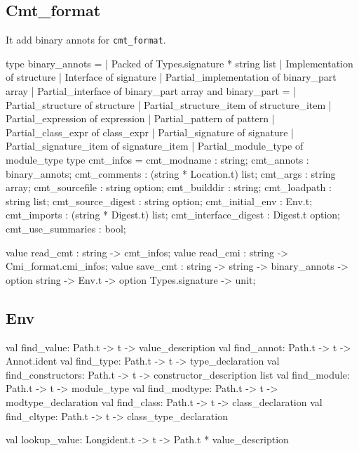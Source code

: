 \subsection{Cmt\_format}


It add binary annots for \verb|cmt_format|.


\begin{ocamlcode}
type binary_annots =
  | Packed of Types.signature * string list
  | Implementation of structure
  | Interface of signature
  | Partial_implementation of binary_part array
  | Partial_interface of binary_part array
and binary_part =
  | Partial_structure of structure
  | Partial_structure_item of structure_item
  | Partial_expression of expression
  | Partial_pattern of pattern
  | Partial_class_expr of class_expr
  | Partial_signature of signature
  | Partial_signature_item of signature_item
  | Partial_module_type of module_type
type cmt_infos = {
  cmt_modname : string;
  cmt_annots : binary_annots;
  cmt_comments : (string * Location.t) list;
  cmt_args : string array;
  cmt_sourcefile : string option;
  cmt_builddir : string;
  cmt_loadpath : string list;
  cmt_source_digest : string option;
  cmt_initial_env : Env.t;
  cmt_imports : (string * Digest.t) list;
  cmt_interface_digest : Digest.t option;
  cmt_use_summaries : bool;
}
\end{ocamlcode}
\begin{ocamlcode}
    value read_cmt : string -> cmt_infos;
    value read_cmi : string -> Cmi_format.cmi_infos;
    value save_cmt :
      string ->
      string ->
      binary_annots ->
      option string -> Env.t -> option Types.signature -> unit;
\end{ocamlcode}


\subsection{Env}

\begin{ocamlcode}
val find_value: Path.t -> t -> value_description
val find_annot: Path.t -> t -> Annot.ident
val find_type: Path.t -> t -> type_declaration
val find_constructors: Path.t -> t -> constructor_description list
val find_module: Path.t -> t -> module_type
val find_modtype: Path.t -> t -> modtype_declaration
val find_class: Path.t -> t -> class_declaration
val find_cltype: Path.t -> t -> class_type_declaration
\end{ocamlcode}

\begin{ocamlcode}
val lookup_value: Longident.t -> t -> Path.t * value_description
\end{ocamlcode}

